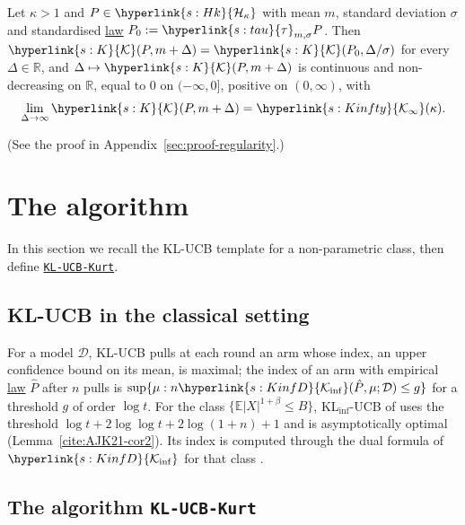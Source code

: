 \documentclass[11pt]{article}
\newcommand{\E}{\mathbb{E}}
\newcommand{\R}{\mathbb{R}}
\newcommand{\sy}[2]{{\hyperlink{#1}{#2}}}
\newcommand{\term}[2]{\hyperlink{#1}{#2}}
\newcommand{\Kinf}{\sy{s:KinfD}{\mathcal{K}_{\inf}}}
\newcommand{\Hk}{\sy{s:Hk}{\mathcal{H}_{\kappa}}}
\newcommand{\Kc}{\sy{s:K}{\mathcal{K}}}
\newcommand{\tauc}{\sy{s:tau}{\tau}}
\newcommand{\Kinfty}{\sy{s:Kinfty}{\mathcal{K}_{\infty}}}
\newcommand{\algo}{\hyperref[alg:kucb]{\texttt{KL-UCB-Kurt}}}
\begin{document}
\begin{corollary}\label{cor:largegap}
Let $\kappa>1$ and $P\in\Hk$ with mean $m$, standard deviation $\sigma$ and standardised \term{w:law}{law}
$P_0:=\tauc_{m,\sigma}P$. Then $\Kc(P,m+\Delta)=\Kc(P_0,\Delta/\sigma)$ for every $\Delta\in\R$, and
$\Delta\mapsto\Kc(P,m+\Delta)$ is continuous and non-decreasing on $\R$, equal to $0$ on $(-\infty,0]$,
positive on $(0,\infty)$, with
\begin{equation*}
  \lim_{\Delta\to\infty}\Kc(P,m+\Delta)=\Kinfty(\kappa).
\end{equation*}
\end{corollary}

(See the proof in Appendix~\ref{sec:proof-regularity}.)

\section{The algorithm}\label{sec:algorithm}

In this section we recall the KL-UCB template for a non-parametric class, then define \algo{}.

\subsection{KL-UCB in the classical setting}

For a model $\mathcal D$, KL-UCB pulls at each round an arm whose index, an upper confidence bound on its mean,
is maximal; the index of an arm with empirical \term{w:law}{law} $\hat P$ after $n$ pulls is
$\sup\{\mu:n\Kinf(\hat P,\mu;\mathcal D)\le g\}$ for a threshold $g$ of order $\log t$. For the class
$\{\E|X|^{1+\beta}\le B\}$, KL$_{\inf}$-UCB of \citet{AJK21} uses the threshold $\log t+2\log\log t+2\log(1+n)+1$
and is asymptotically optimal (Lemma~\ref{cite:AJK21-cor2}). Its index is computed through the dual formula
of $\Kinf$ for that class \citep[Lemma~7]{AJK21}.

\subsection{\texorpdfstring{The algorithm \texttt{KL-UCB-Kurt}}{The algorithm KL-UCB-Kurt}}
\end{document}
